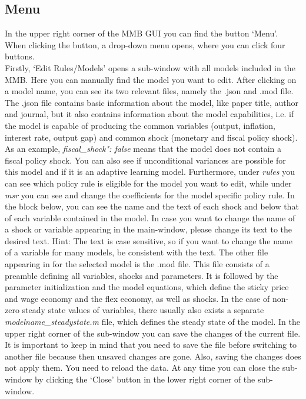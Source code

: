 \subsection*{Menu}
In the upper right corner of the MMB GUI you can find the button `Menu'. When clicking the button, a drop-down menu opens, where you can click four buttons.\\
Firstly, `Edit Rules/Models' opens a sub-window with all models included in the MMB. Here you can manually find the model you want to edit. After clicking on a model name, you can see its two relevant files, namely the .json and .mod file. The .json file contains basic information about the model, like paper title, author and journal, but it also contains information about the model capabilities, i.e. if the model is capable of producing the common variables (output, inflation, interest rate, output gap) and common shock (monetary and fiscal policy shock). As an example, \textit{fiscal\_shock": false} means that the model does not contain a fiscal policy shock. You can also see if unconditional variances are possible for this model and if it is an adaptive learning model. Furthermore, under \textit{rules} you can see which policy rule is eligible for the model you want to edit, while under \textit{msr} you can see and change the coefficients for the model specific policy rule. In the block below, you can see the name and the text of each shock and below that of each variable contained in the model. In case you want to change the name of a shock or variable appearing in the main-window, please change its text to the desired text. Hint: The text is case sensitive, so if you want to change the name of a variable for many models, be consistent with the text. The other file appearing in for the selected model is the .mod file. This file consists of a preamble defining all variables, shocks and parameters. It is followed by the parameter initialization and the model equations, which define the sticky price and wage economy and the flex economy, as well as shocks. In the case of non-zero steady state values of variables, there usually also exists a separate \textit{modelname\_steadystate.m} file, which defines the steady state of the model. In the upper right corner of the sub-window you can save the changes of the current file. It is important to keep in mind that you need to save the file before switching to another file because then unsaved changes are gone. Also, saving the changes does not apply them. You need to reload the data. At any time you can close the sub-window by clicking the `Close' button in the lower right corner of the sub-window. 

